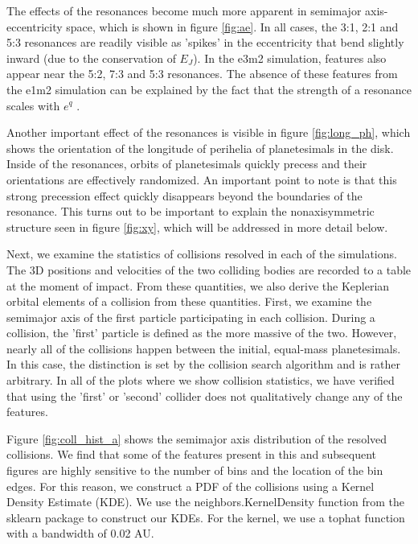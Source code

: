 \documentclass[twocolumn]{aastex63}
\begin{document}
The effects of the resonances become much more apparent in semimajor axis-eccentricity space, which is shown in figure \ref{fig:ae}. In all cases, 
the 3:1, 2:1 and 5:3 resonances are readily visible as 'spikes' in the eccentricity that bend slightly inward (due to the conservation of $E_{J}$). In the 
e3m2 simulation, features also appear near the 5:2, 7:3 and 5:3 resonances. The absence of these features from the e1m2 simulation can be 
explained by the fact that the strength of a resonance scales with $e^{q}$ \citep{1994PhyD...77..289M}.

Another important effect of the resonances is visible in figure \ref{fig:long_ph}, which shows the orientation of the longitude of perihelia of 
planetesimals in the disk. Inside of the resonances, orbits of planetesimals quickly precess and their orientations are effectively randomized. An 
important point to note is that this strong precession effect quickly disappears beyond the boundaries of the resonance. This turns out to be 
important to explain the nonaxisymmetric structure seen in figure \ref{fig:xy}, which will be addressed in more detail below.

Next, we examine the statistics of collisions resolved in each of the simulations. The 3D positions and velocities of the two colliding bodies are 
recorded to a table at the moment of impact. From these quantities, we also derive the Keplerian orbital elements of a collision from these quantities. 
First, we examine the semimajor axis of the first particle participating in each collision. During a collision, the 'first' particle is defined as the more 
massive of the two. However, nearly all of the collisions happen between the initial, equal-mass planetesimals. In this case, the distinction is set by 
the collision search algorithm and is rather arbitrary. In all of the plots where we show collision statistics, we have verified that using the 'first' or 
'second' collider does not qualitatively change any of the features.

Figure \ref{fig:coll_hist_a} shows the semimajor axis distribution of the resolved collisions. We find that some of the features present in this and 
subsequent figures are highly sensitive to the number of bins and the location of the bin edges. For this reason, we construct a PDF of the collisions 
using a Kernel Density Estimate (KDE). We use the {\sc neighbors.KernelDensity} function from the {\sc sklearn} \citep{scikit-learn} package to 
construct our KDEs. For the kernel, we use a tophat function with a bandwidth of 0.02 AU.
\end{document}
